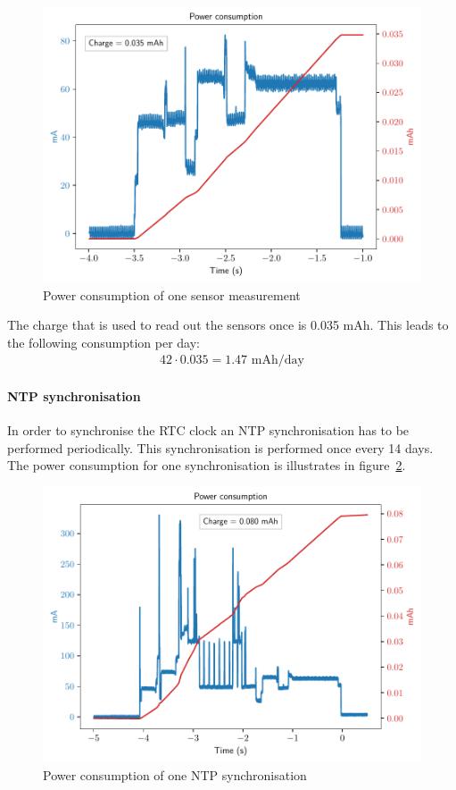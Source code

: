 \documentclass[11pt,a4paper]{article}
\begin{document}
\begin{figure}[H]
	\centering
	\includegraphics[width=1.0\linewidth]{sensor_pwr.pdf}
	\caption{Power consumption of one sensor measurement}
	\label{fig:sens_pwr}
\end{figure}

The charge that is used to read out the sensors once is 0.035 mAh. This leads to the following consumption per day:
\begin{gather*}
	42 \cdot 0.035 = 1.47\text{ mAh/day}
\end{gather*}

\paragraph{NTP synchronisation}
In order to synchronise the RTC clock an NTP synchronisation has to be performed periodically. This synchronisation is performed once every 14 days. The power consumption for one synchronisation is illustrates in figure~\ref{fig:ntp_pwr}.

\begin{figure}[H]
	\centering
	\includegraphics[width=1.0\linewidth]{sync_pwr.pdf}
	\caption{Power consumption of one NTP synchronisation}
	\label{fig:ntp_pwr}
\end{figure}
\end{document}
